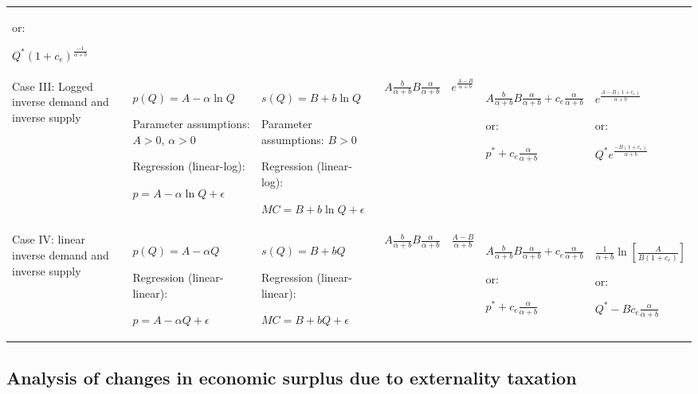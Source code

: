 \documentclass[
]{book}
\begin{document}
\begin{table}
\begin{tabular}[t]{lllllll}
  or:

  $Q^\ast (1 + c_e)^{\frac{-1}{\alpha + b}}$\\
Case III: Logged inverse demand and inverse supply & $p(Q)=A-\alpha \ln Q$

Parameter assumptions:
$A>0$, $\alpha>0$

Regression (linear-log):

$p=A- \alpha \ln Q + \epsilon$ & $s(Q) = B + b \ln Q$

Parameter assumptions:
$B>0$

Regression (linear-log):

$MC = B + b \ln Q + \epsilon$ & $A \frac{b}{\alpha + b} B \frac{\alpha}{\alpha + b}$ & $e^{\frac{A-B}{\alpha + b}}$ & $A \frac{b}{\alpha + b} B \frac{\alpha}{\alpha + b} + c_e \frac{\alpha}{\alpha + b}$

  or:

  $p^\ast + c_e \frac{\alpha}{\alpha + b}$ & $e^{\frac{A - B(1+c_e)}{\alpha +b}}$

  or:

  $Q^\ast e^{\frac{-B(1+c_e)}{\alpha + b}}$\\
Case IV: linear inverse demand and inverse supply & $p(Q)=A- \alpha Q$

Regression (linear-linear):

$p=A-\alpha Q+ \epsilon$ & $s(Q)=B+bQ$

Regression (linear-linear):

$MC=B+bQ+\epsilon$ & $A \frac{b}{\alpha + b} B \frac{\alpha}{\alpha + b}$ & $\frac{A - B}{\alpha + b}$ & $A \frac{b}{\alpha + b} B \frac{\alpha}{\alpha + b} + c_e \frac{\alpha}{\alpha + b}$

  or:

  $p^\ast + c_e \frac{\alpha}{\alpha + b}$ & $\frac{1}{\alpha + b} \ln \left[\frac{A}{B(1 + c_e)} \right]$

  or:

  $Q^\ast - B c_e \frac{\alpha}{\alpha + b}$\\
\bottomrule
\end{tabular}
\end{table}

\hypertarget{analysis-of-changes-in-economic-surplus-due-to-externality-taxation}{%
\subsection{Analysis of changes in economic surplus due to externality taxation}\label{analysis-of-changes-in-economic-surplus-due-to-externality-taxation}}
\end{document}

